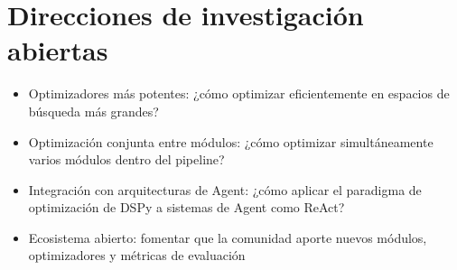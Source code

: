\section{Direcciones de investigación abiertas}

\begin{itemize}
    \item Optimizadores más potentes: ¿cómo optimizar eficientemente en espacios de búsqueda más grandes?
    \item Optimización conjunta entre módulos: ¿cómo optimizar simultáneamente varios módulos dentro del pipeline?
    \item Integración con arquitecturas de Agent: ¿cómo aplicar el paradigma de optimización de DSPy a sistemas de Agent como ReAct?
    \item Ecosistema abierto: fomentar que la comunidad aporte nuevos módulos, optimizadores y métricas de evaluación
\end{itemize}

